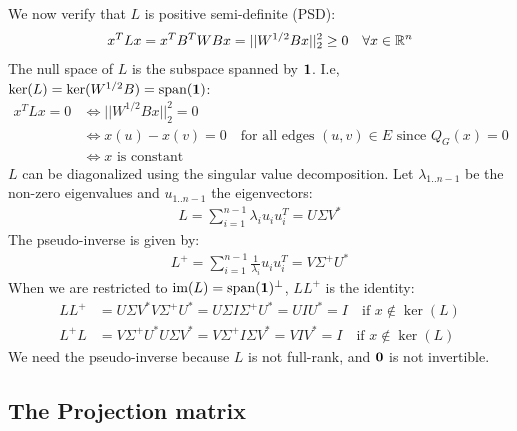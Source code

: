 \documentclass{article}
\begin{document}
We now verify that $L$ is positive semi-definite (PSD):
\begin{align*}
    x^TLx = x^TB^TWBx = ||W^{1/2}Bx||^2_2 \geq 0 \quad \forall{x
    \in \mathbb{R}^n}
\end{align*}
The null space of $L$ is the subspace spanned by $\mathbf{1}$. I.e, $\ker(L) =
\ker(W^{1/2}B) = \text{span}(\mathbf{1})$:
\begin{align*}
    x^TLx = 0 &\Leftrightarrow ||W^{1/2}Bx||^2_2 = 0 \\
                &\Leftrightarrow x(u) - x(v) = 0 \quad \text{for all edges }
    (u, v) \in E \text{ since } Q_G(x) = 0 \\
    &\Leftrightarrow x \text{ is constant}
\end{align*}
$L$ can be diagonalized using the singular value decomposition. Let
$\lambda_{1..n-1}$ be the non-zero eigenvalues and $u_{1..n-1}$ the
eigenvectors:
\begin{align*}
    L = \sum_{i=1}^{n-1} \lambda_iu_iu^T_i = U\Sigma V^*
\end{align*}
The pseudo-inverse is given by:
\begin{align*}
    L^+ = \sum_{i=1}^{n-1} \frac{1}{\lambda_i}u_iu^T_i = V\Sigma^+ U^*
\end{align*}
When we are restricted to $\text{im}(L) = \text{span}(\mathbf{1})^{\bot}$, $LL^+$ is the
identity:
\begin{align*}
    LL^+ &= U\Sigma V^*V\Sigma^+ U^*
             = U\Sigma I \Sigma^+ U^*
             = U I U^*
             = I \quad \text{if } x \not\in \ker(L) \\
    L^+L &= V\Sigma^+ U^*U\Sigma V^*
             = V\Sigma^+ I \Sigma V^*
             = V I V^*
             = I \quad \text{if } x \not\in \ker(L)
\end{align*}
We need the pseudo-inverse because $L$ is not full-rank, and $\mathbf{0}$ is not
invertible.

\subsection{The Projection matrix}
\end{document}
